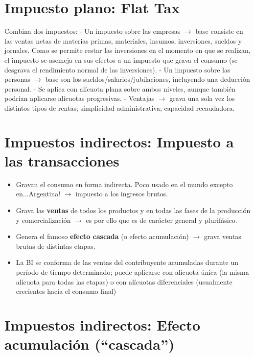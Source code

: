\documentclass[
  letterpaper,
  DIV=11,
  numbers=noendperiod]{scrartcl}
\providecommand{\tightlist}{%
  \setlength{\itemsep}{0pt}\setlength{\parskip}{0pt}}\usepackage{longtable,booktabs,array}
\begin{document}
\section{\texorpdfstring{\textbf{Impuesto plano: Flat
Tax}}{Impuesto plano: Flat Tax}}\label{impuesto-plano-flat-tax}

Combina dos impuestos: - Un impuesto sobre las empresas
\(\longrightarrow\) base consiste en las ventas netas de materias
primas, materiales, insumos, inversiones, sueldos y jornales. Como se
permite restar las inversiones en el momento en que se realizan, el
impuesto se asemeja en sus efectos a un impuesto que grava el consumo
(se desgrava el rendimiento normal de las inversiones). - Un impuesto
sobre las personas \(\longrightarrow\) base son los
sueldos/salarios/jubilaciones, incluyendo una deducción personal. - Se
aplica con alícuota plana sobre ambos niveles, aunque también podrían
aplicarse alícuotas progresivas. - Ventajas \(\longrightarrow\) grava
una sola vez los distintos tipos de rentas; simplicidad administrativa;
capacidad recaudadora.

\section{\texorpdfstring{\textbf{Impuestos indirectos: Impuesto a las
transacciones}}{Impuestos indirectos: Impuesto a las transacciones}}\label{impuestos-indirectos-impuesto-a-las-transacciones}

\begin{itemize}
\tightlist
\item
  Gravan el consumo en forma indirecta. Poco usado en el mundo excepto
  en...Argentina! \(\longrightarrow\) impuesto a los ingresos brutos.
\item
  Grava las \textbf{ventas} de todos los productos y en todas las fases
  de la producción y comercialización \(\longrightarrow\) es por ello
  que es de carácter general y plurifásico.
\item
  Genera el famoso \textbf{efecto cascada} (o efecto acumulación)
  \(\longrightarrow\) grava ventas brutas de distintas etapas.
\item
  La BI se conforma de las ventas del contribuyente acumuladas durante
  un período de tiempo determinado; puede aplicarse con alícuota única
  (la misma alícuota para todas las etapas) o con alícuotas
  diferenciales (usualmente crecientes hacia el consumo final)
\end{itemize}

\section{\texorpdfstring{\textbf{Impuestos indirectos: Efecto
acumulación
(``cascada'')}}{Impuestos indirectos: Efecto acumulación (``cascada'')}}\label{impuestos-indirectos-efecto-acumulaciuxf3n-cascada}
\end{document}
